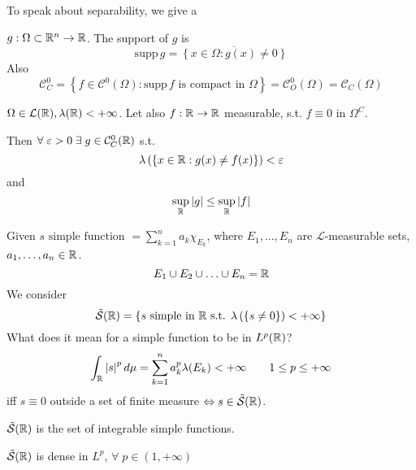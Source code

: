 To speak about separability, we give a 
\begin{definition}
    \(g: \Omega \subset \mathbb{R}^n \to \mathbb{R}\). The support of \(g\) is
    \[
      \mbox{supp}\, g = \overline{\left\{ x \in \Omega : g(x) \neq 0 \right\}}
    \]
    Also 
    \[
        \mathcal{C}^0_C = \left\{ f \in \mathcal{C}^0\left( \Omega \right) : \mbox{supp} \, f \mbox{ is compact in } \Omega\right\} = \mathcal{C}^0_O(\Omega) = \mathcal{C}_C(\Omega)
    \]
\end{definition}
\begin{theorem}
    \(\Omega \in \mathcal{L}(\mathbb{R}), \lambda(\mathbb{R}) < +\infty\). Let also \(f : \mathbb{R} \to \mathbb{R}\) measurable, s.t. \(f\equiv 0\) in \(\Omega^C\).

    Then \(\forall \; \varepsilon > 0 \; \exists \; g \in \mathcal{C}^0_C(\mathbb{R})\) s.t.
    \[
        \lambda \left( \left\{ x \in \mathbb{R} : g(x) \neq f(x) \right\} \right) < \varepsilon
    \]
    and
    \[
        \sup_{\mathbb{R}} \abs{g} \leq \sup_{\mathbb{R}} \abs{f}
    \]
\end{theorem}
\begin{definition}
    Given \(s \mbox{ simple function } = \sum_{k=1}^n a_k \chi_{E_k}\), where \(E_1, \ldots, E_n\) are \(\mathcal{L}\)-measurable sets, \(a_1, \ldots, a_n \in \mathbb{R}\). 
    \[
        E_1 \cup E_2 \cup \ldots \cup E_n = \mathbb{R}
    \]
    We consider
    \[
        \tilde{\mathcal{S}}(\mathbb{R}) = \left\{ s \mbox{ simple in } \mathbb{R} \mbox{ s.t. } \lambda\left( \left\{ s \neq 0 \right\} \right) < +\infty \right\}
    \]
    What does it mean for a simple function to be in \(L^p(\mathbb{R})\)? 
    \[
        \int_{\mathbb{R}} \abs{s}^p \, d\mu = \sum_{k=1}^n a_k^p \lambda(E_k) < +\infty
    \tag*{\(1 \leq p \leq +\infty\)}\]
    iff \(s \equiv 0\) outside a set of finite measure \(\Leftrightarrow s \in \tilde{\mathcal{S}}(\mathbb{R})\).

    \(\tilde{\mathcal{S}}(\mathbb{R})\) is the set of integrable simple functions.
\end{definition}
\begin{theorem}
    \(\tilde{\mathcal{S}}(\mathbb{R})\) is dense in \(L^p\), \(\forall \; p \in (1, +\infty)\)
\end{theorem}

